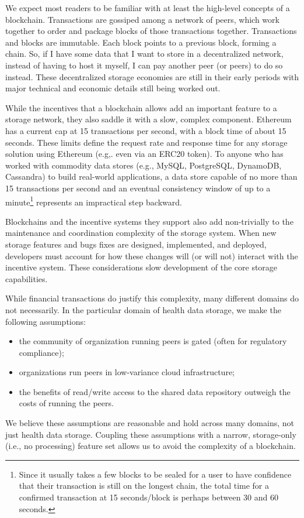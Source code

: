 \documentclass[10pt]{article}
\begin{document}
We expect most readers to be familiar with at least the high-level concepts of a blockchain. Transactions are gossiped among a network of peers, which work together to order and package blocks of those transactions together. Transactions and blocks are immutable. Each block points to a previous block, forming a chain. So, if I have some data that I want to store in a decentralized network, instead of having to host it myself, I can pay another peer (or peers) to do so instead. These decentralized storage economies are still in their early periods with major technical and economic details still being worked out.

While the incentives that a blockchain allows add an important feature to a storage network, they also saddle it with a slow, complex component. Ethereum has a current cap at 15 transactions per second, with a block time of about 15 seconds. These limits define the request rate and response time for any storage solution using Ethereum (e.g,. even via an ERC20 token). To anyone who has worked with commodity data stores (e.g., MySQL, PostgreSQL, DynamoDB, Cassandra) to build real-world applications, a data store capable of no more than 15 transactions per second and an eventual consistency window of up to a minute\footnote{Since it usually takes a few blocks to be sealed for a user to have confidence that their transaction is still on the longest chain, the total time for a confirmed transaction at 15 seconds/block is perhaps between 30 and 60 seconds.} represents an impractical step backward.

Blockchains and the incentive systems they support also add non-trivially to the maintenance and coordination complexity of the storage system. When new storage features and bugs fixes are designed, implemented, and deployed, developers must account for how these changes will (or will not) interact with the incentive system. These considerations slow development of the core storage capabilities. 

While financial transactions do justify this complexity, many different domains do not necessarily. In the particular domain of health data storage, we make the following assumptions:
\begin{itemize}
	\item the community of organization running peers is gated (often for regulatory compliance);
	\item organizations run peers in low-variance cloud infrastructure;
	\item the benefits of read/write access to the shared data repository outweigh the costs of running the peers.
\end{itemize}
We believe these assumptions are reasonable and hold across many domains, not just health data storage. Coupling these assumptions with a narrow, storage-only (i.e., no processing) feature set allows us to avoid the complexity of a blockchain.
\end{document}
